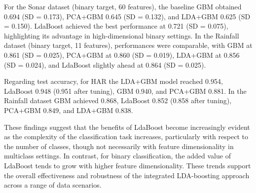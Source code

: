 \documentclass[11pt,a4paper]{article}
\begin{document}
{For the Sonar dataset (binary target, 60 features), the baseline GBM obtained 0.694 (SD = 0.173), PCA+GBM 0.645 (SD = 0.132), and LDA+GBM 0.625 (SD = 0.150). LdaBoost achieved the best performance at 0.721 (SD = 0.075), highlighting its advantage in high-dimensional binary settings. In the Rainfall dataset (binary target, 11 features), performances were comparable, with GBM at 0.861 (SD = 0.025), PCA+GBM at 0.860 (SD = 0.019), LDA+GBM at 0.856 (SD = 0.024), and LdaBoost slightly ahead at 0.864 (SD = 0.025).

Regarding test accuracy, for HAR the LDA+GBM model reached 0.954, LdaBoost 0.948 (0.951 after tuning), GBM 0.940, and PCA+GBM 0.881. In the Rainfall dataset GBM achieved 0.868, LdaBoost 0.852 (0.858 after tuning), PCA+GBM 0.849, and LDA+GBM 0.838.

These findings suggest that the benefits of LdaBoost become increasingly evident as the complexity of the classification task increases, particularly with respect to the number of classes, though not necessarily with feature dimensionality in multiclass settings. In contrast, for binary classification, the added value of LdaBoost tends to grow with higher feature dimensionality. These trends support the overall effectiveness and robustness of the integrated LDA-boosting approach across a range of data scenarios.
}

\renewcommand{\thetable}{A\arabic{table}}
\setcounter{table}{0}
\end{document}
